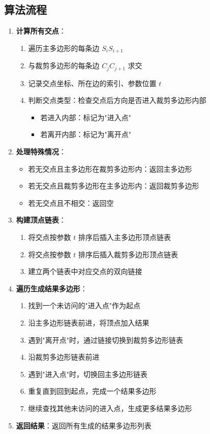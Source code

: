 \documentclass[12pt,a4paper]{article}
\begin{document}
\subsection{算法流程}
\begin{enumerate}
    \item \textbf{计算所有交点}：
    \begin{enumerate}
        \item 遍历主多边形的每条边 $S_iS_{i+1}$
        \item 与裁剪多边形的每条边 $C_jC_{j+1}$ 求交
        \item 记录交点坐标、所在边的索引、参数位置 $t$
        \item 判断交点类型：检查交点后方向是否进入裁剪多边形内部
        \begin{itemize}
            \item 若进入内部：标记为"进入点"
            \item 若离开内部：标记为"离开点"
        \end{itemize}
    \end{enumerate}
    
    \item \textbf{处理特殊情况}：
    \begin{itemize}
        \item 若无交点且主多边形在裁剪多边形内：返回主多边形
        \item 若无交点且裁剪多边形在主多边形内：返回裁剪多边形
        \item 若无交点且不相交：返回空
    \end{itemize}
    
    \item \textbf{构建顶点链表}：
    \begin{enumerate}
        \item 将交点按参数 $t$ 排序后插入主多边形顶点链表
        \item 将交点按参数 $t$ 排序后插入裁剪多边形顶点链表
        \item 建立两个链表中对应交点的双向链接
    \end{enumerate}
    
    \item \textbf{遍历生成结果多边形}：
    \begin{enumerate}
        \item 找到一个未访问的"进入点"作为起点
        \item 沿主多边形链表前进，将顶点加入结果
        \item 遇到"离开点"时，通过链接切换到裁剪多边形链表
        \item 沿裁剪多边形链表前进
        \item 遇到"进入点"时，切换回主多边形链表
        \item 重复直到回到起点，完成一个结果多边形
        \item 继续查找其他未访问的进入点，生成更多结果多边形
    \end{enumerate}
    
    \item \textbf{返回结果}：返回所有生成的结果多边形列表
\end{enumerate}
\end{document}

